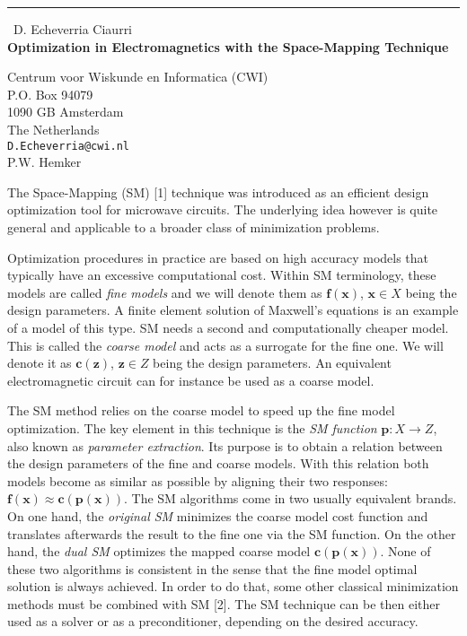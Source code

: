 \documentclass{report}
\begin{document}
\begin{center}
\rule{6in}{1pt} \
{\large D. Echeverria Ciaurri \\
{\bf Optimization in Electromagnetics with the Space-Mapping Technique}}

Centrum voor Wiskunde en Informatica (CWI) \\ P.O. Box 94079 \\ 1090 GB Amsterdam \\ The Netherlands
\\
{\tt D.Echeverria@cwi.nl}\\
P.W. Hemker\end{center}

The Space-Mapping (SM) [1] technique was introduced as an efficient design optimization
tool for microwave circuits. The underlying idea however is quite general
and applicable to a broader class of minimization problems.

Optimization procedures in practice are based on high accuracy models that typically
have an excessive computational cost. Within SM terminology, these models are called
{\it fine models} and we will denote them as ${\mathbf f}({\mathbf x})$,
${\mathbf x} \in X$ being the design parameters. A finite element solution of Maxwell's
equations is an example of a model of this type. SM needs a second and computationally
cheaper model. This is called the {\it coarse model} and acts as a surrogate
for the fine one. We will denote it as ${\mathbf c}({\mathbf z})$, ${\mathbf z} \in Z$
being the design parameters. An equivalent electromagnetic circuit can for instance be
used as a coarse model.

The SM method relies on the coarse model to speed up the fine model optimization. The key
element in this technique is the {\it SM function} ${\mathbf p}:X \rightarrow Z$, also
known as {\it parameter extraction}. Its purpose is to obtain a relation
between the design
parameters of the fine and coarse models. With this relation both models become
as similar as possible by aligning their two responses:
${\mathbf f}({\mathbf x}) \approx {\mathbf c}({\mathbf p}({\mathbf x}))$.
The SM algorithms come in two usually equivalent brands. On one hand, the
{\it original SM}
minimizes the coarse model cost function and translates afterwards the result to the
fine one via the SM function. On the other hand, the {\it dual SM}
optimizes the mapped coarse
model ${\mathbf c}({\mathbf p}({\mathbf x}))$. None of these two algorithms is consistent
in the sense that the fine model optimal solution is always achieved. In
order to do that,
some other classical minimization methods must be combined with SM [2]. The SM technique
can be then either used as a solver or as a preconditioner, depending on
the desired accuracy.
\end{document}
